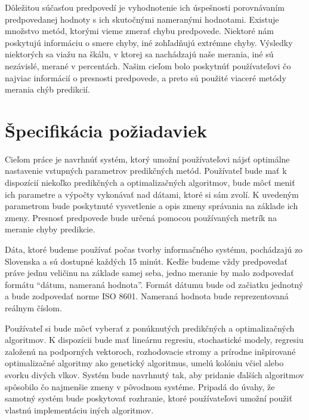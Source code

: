 \documentclass[a4paper,slovak,12pt,appendix]{article}
\begin{document}
Dôležitou súčasťou predpovedí je vyhodnotenie ich úspešnosti porovnávaním
predpovedanej hodnoty s ich skutočnými nameranými hodnotami. Existuje množstvo
metód, ktorými vieme zmerať chybu predpovede. Niektoré nám poskytujú informáciu
o smere chyby, iné zohľadňujú extrémne chyby. Výsledky niektorých sa viažu na
škálu, v ktorej sa nachádzajú naše merania, iné sú nezávislé, merané v
percentách. Našim cieľom bolo poskytnúť používateľovi čo najviac informácií
o presnosti predpovede, a preto sú použité viaceré metódy merania chýb
predikcií.


\newpage
\section{Špecifikácia požiadaviek}
\label{specification}
Cieľom práce je navrhnúť systém, ktorý umožní používateľovi nájsť optimálne
nastavenie vstupných parametrov predikčných metód. Používateľ bude mať
k dispozícií niekoľko predikčných a optimalizačných algoritmov, bude môcť
meniť ich parametre a výpočty vykonávať nad dátami, ktoré si sám zvolí.
K uvedeným parametrom bude poskytnuté vysvetlenie a opis zmeny správania na
základe ich zmeny. Presnosť predpovede bude určená pomocou používaných metrík
na meranie chyby predikcie.

Dáta, ktoré budeme používať počas tvorby informačného systému, pochádzajú zo
Slovenska a sú dostupné každých 15 minút. Keďže budeme vždy predpovedať práve
jednu veličinu na základe samej seba, jedno meranie by malo zodpovedať formátu
``dátum, nameraná hodnota''. Formát dátumu bude od začiatku jednotný a bude
zodpovedať norme ISO 8601. Nameraná hodnota bude reprezentovaná reálnym číslom.

Používateľ si bude môcť vyberať z ponúknutých predikčných a optimalizačných
algoritmov. K dispozícii bude mať lineárnu regresiu, stochastické modely,
regresiu založenú na podporných vektoroch, rozhodovacie stromy a prírodne
inšpirované optimalizačné algoritmy ako genetický algoritmus, umelú kolóniu
včiel alebo svorku divých vlkov. Systém bude navrhnutý tak, aby pridanie
ďalších algoritmov spôsobilo čo najmenšie zmeny v pôvodnom systéme.
Pripadá do úvahy, že samotný systém bude poskytovať rozhranie, ktoré
používateľovi umožní použiť vlastnú implementáciu iných algoritmov.
\end{document}
